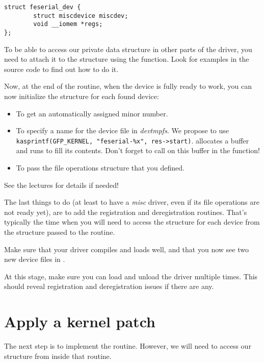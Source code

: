 \begin{verbatim}
struct feserial_dev {
        struct miscdevice miscdev;
        void __iomem *regs;
};
\end{verbatim}

To be able to access our private data structure in other parts of the
driver, you need to attach it to the  structure using the
 function. Look for examples in the
source code to find out how to do it.

Now, at the end of the  routine, when the device is fully ready
to work, you can now initialize the  structure
for each found device:

\begin{itemize}
\item To get an automatically assigned minor number.
\item To specify a name for the device file in {\em devtmpfs}. We
  propose to use {\tt kasprintf(GFP\_KERNEL,
    "feserial-\%x", res->start)}.  allocates a buffer
    and runs  to fill its contents.  Don't forget to
    call  on this buffer in the 
    function!
\item To pass the file operations structure that you defined.
\end{itemize}

See the lectures for details if needed!

The last things to do (at least to have a {\em misc} driver, even if
its file operations are not ready yet), are to add the registration and
deregistration routines. That's typically the time when you will need
to access the  structure for each device from the
 structure passed to the  routine.

Make sure that your driver compiles and loads well, and that you
now see two new device files in .

At this stage, make sure you can load and unload the driver multiple
times. This should reveal registration and deregistration issues if
there are any.

\section{Apply a kernel patch}

The next step is to implement the  routine. However, we
will need to access our  structure from inside that
routine.


